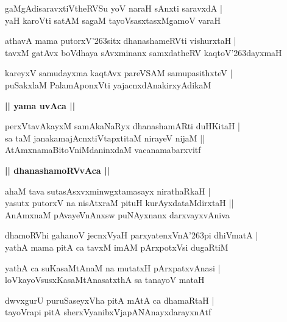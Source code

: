 \documentclass[twoside,12pt,openright]{book}
\def\S{\char'263}
\newcounter{shloka}[chapter]
\def\uvaca#1{\centerline{{\large\textbf{#1}}}}
\begin{document}
\begin{shloka}%
gaMgAdisaravxtiVtheRVSu yoV naraH sAnxti saravxdA |\\
yaH karoVti satAM sagaM tayoVsasxtasxMgamoV varaH 
\end{shloka}

\begin{shloka}%
athavA mama putorxV\S sitx dhanashameRVti vishurxtaH |\\
tavxM gatAvx boVdhaya sAvxminanx samxdatheRV kaqtoV\S dayxmaH 
\end{shloka}

\begin{shloka}%
kareyxV samudayxma kaqtAvx pareVSAM samupasithxteV |\\
puSakxlaM PalamAponxVti yajacnxdAnakirxyAdikaM 
\end{shloka}

\uvaca{|| yama uvAca ||}

\begin{shloka}%
perxVtavAkayxM samAkaNaRyx dhanashamARti duHKitaH |\\
sa taM janakamajAcnxtiVtapxtitaM nirayeV nijaM ||\\
AtAmxnamaBitoVniMdaninxdaM vacanamabarxvitf 
\end{shloka}

\uvaca{|| dhanashamoRVvAca ||}

\begin{shloka}%
ahaM tava sutasAsxvxminwgxtamasayx nirathaRkaH |\\
yasutx putorxV na nisAtxraM pituH kurAyxdataMdirxtaH ||\\
AnAmxnaM pAvayeVnAnxsw puNAyxnanx darxvayxvAniva
\end{shloka}

\begin{shloka}%
dhamoRVhi gahanoV jecnxVyaH parxyatenxVnA\S pi dhiVmatA |\\
yathA mama pitA ca tavxM imAM pArxpotxVsi dugaRtiM 
\end{shloka}

\begin{shloka}%
yathA ca suKasaMtAnaM na mutatxH pArxpatxvAnasi |\\
loVkayoVsusxKasaMtAnasatxthA sa tanayoV mataH 
\end{shloka}

\begin{shloka}%
dwvxgurU puruSaseyxVha pitA mAtA ca dhamaRtaH |\\
tayoVrapi pitA sherxVyanibxVjapANAnayxdarayxnAtf 
\end{shloka}
\end{document}

